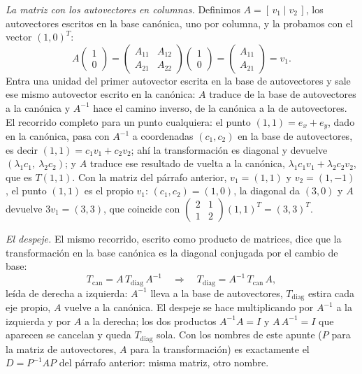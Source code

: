 \emph{La matriz con los autovectores en columnas.} Definimos \(A=[\,v_1\mid v_2\,]\), los
autovectores escritos en la base canónica, uno por columna, y la probamos con el vector
\((1,0)^T\):
\[
  A\begin{pmatrix}1\\0\end{pmatrix}
  =\begin{pmatrix}A_{11}&A_{12}\\A_{21}&A_{22}\end{pmatrix}\begin{pmatrix}1\\0\end{pmatrix}
  =\begin{pmatrix}A_{11}\\A_{21}\end{pmatrix}=v_1 .
\]
Entra una unidad del primer autovector escrita en la base de autovectores y sale ese mismo
autovector escrito en la canónica: \(A\) traduce de la base de autovectores a la canónica
y \(A^{-1}\) hace el camino inverso, de la canónica a la de autovectores. El recorrido
completo para un punto cualquiera: el punto \((1,1)=e_x+e_y\), dado en la canónica, pasa
con \(A^{-1}\) a coordenadas \((c_1,c_2)\) en la base de autovectores, es decir
\((1,1)=c_1v_1+c_2v_2\); ahí la transformación es diagonal y devuelve
\((\lambda_1c_1,\ \lambda_2c_2)\); y \(A\) traduce ese resultado de vuelta a la canónica,
\(\lambda_1c_1v_1+\lambda_2c_2v_2\), que es \(T(1,1)\). Con la matriz del párrafo
anterior, \(v_1=(1,1)\) y \(v_2=(1,-1)\), el punto \((1,1)\) es el propio \(v_1\):
\((c_1,c_2)=(1,0)\), la diagonal da \((3,0)\) y \(A\) devuelve \(3v_1=(3,3)\), que
coincide con \(\begin{pmatrix}2&1\\1&2\end{pmatrix}(1,1)^T=(3,3)^T\).

\emph{El despeje.} El mismo recorrido, escrito como producto de matrices, dice que la
transformación en la base canónica es la diagonal conjugada por el cambio de base:
\[
  T_{\mathrm{can}}=A\,T_{\mathrm{diag}}\,A^{-1}
  \quad\Longrightarrow\quad
  T_{\mathrm{diag}}=A^{-1}\,T_{\mathrm{can}}\,A ,
\]
leída de derecha a izquierda: \(A^{-1}\) lleva a la base de autovectores,
\(T_{\mathrm{diag}}\) estira cada eje propio, \(A\) vuelve a la canónica. El despeje se
hace multiplicando por \(A^{-1}\) a la izquierda y por \(A\) a la derecha; los dos
productos \(A^{-1}A=I\) y \(A\,A^{-1}=I\) que aparecen se cancelan y queda
\(T_{\mathrm{diag}}\) sola. Con los nombres de este apunte (\(P\) para la matriz de
autovectores, \(A\) para la transformación) es exactamente el \(D=P^{-1}AP\) del párrafo
anterior: misma matriz, otro nombre.

